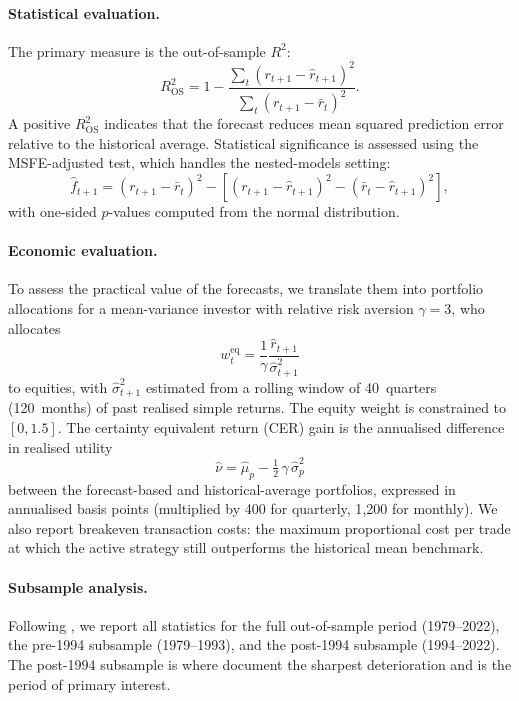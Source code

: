 \documentclass[a4paper,11pt]{article}
\begin{document}
\paragraph{Statistical evaluation.} The primary measure is the
out-of-sample $R^2$:
\begin{equation}\label{eq:r2os}
    R^2_{\mathrm{OS}} = 1 - \frac{\sum_{t}(r_{t+1} - \hat{r}_{t+1})^2}
                                  {\sum_{t}(r_{t+1} - \bar{r}_t)^2}.
\end{equation}
A positive $R^2_{\mathrm{OS}}$ indicates that the forecast reduces mean
squared prediction error relative to the historical average.
Statistical significance is assessed using the \citet{clarkwest2007}
MSFE-adjusted test, which handles the nested-models setting:
\begin{equation}\label{eq:cw}
    \hat{f}_{t+1} =
        (r_{t+1} - \bar{r}_t)^2
        - \left[(r_{t+1} - \hat{r}_{t+1})^2
        - (\bar{r}_t - \hat{r}_{t+1})^2\right],
\end{equation}
with one-sided $p$-values computed from the normal distribution.

\paragraph{Economic evaluation.} To assess the practical value of the
forecasts, we translate them into portfolio allocations for a
mean-variance investor with relative risk aversion $\gamma = 3$, who
allocates
\begin{equation}\label{eq:allocation}
    w^{\mathrm{eq}}_t = \frac{1}{\gamma}
    \frac{\hat{r}_{t+1}}{\hat{\sigma}^2_{t+1}}
\end{equation}
to equities, with $\hat{\sigma}^2_{t+1}$ estimated from a rolling window
of 40~quarters (120~months) of past realised simple returns. The equity
weight is constrained to $[0, 1.5]$. The certainty equivalent return
(CER) gain is the annualised difference in realised utility
\begin{equation}\label{eq:utility}
    \hat{\nu} = \hat{\mu}_p - \tfrac{1}{2}\,\gamma\,\hat{\sigma}^2_p
\end{equation}
between the forecast-based and historical-average portfolios, expressed
in annualised basis points (multiplied by 400 for quarterly, 1{,}200 for
monthly). We also report breakeven transaction costs: the maximum
proportional cost per trade at which the active strategy still
outperforms the historical mean benchmark.

\paragraph{Subsample analysis.} Following \citet{denkloffler2024}, we
report all statistics for the full out-of-sample period (1979--2022),
the pre-1994 subsample (1979--1993), and the post-1994 subsample
(1994--2022). The post-1994 subsample is where
\citet{denkloffler2024} document the sharpest deterioration and is the
period of primary interest.
\end{document}

